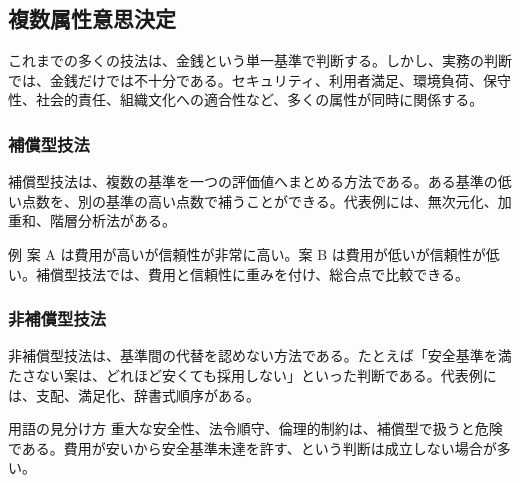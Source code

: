 \subsection{複数属性意思決定}

これまでの多くの技法は、金銭という単一基準で判断する。しかし、実務の判断では、金銭だけでは不十分である。セキュリティ、利用者満足、環境負荷、保守性、社会的責任、組織文化への適合性など、多くの属性が同時に関係する。

\subsubsection{補償型技法}

補償型技法は、複数の基準を一つの評価値へまとめる方法である。ある基準の低い点数を、別の基準の高い点数で補うことができる。代表例には、無次元化、加重和、階層分析法がある。

\begin{notebox}{例}
案 A は費用が高いが信頼性が非常に高い。案 B は費用が低いが信頼性が低い。補償型技法では、費用と信頼性に重みを付け、総合点で比較できる。
\end{notebox}

\subsubsection{非補償型技法}

非補償型技法は、基準間の代替を認めない方法である。たとえば「安全基準を満たさない案は、どれほど安くても採用しない」といった判断である。代表例には、支配、満足化、辞書式順序がある。

\begin{notebox}{用語の見分け方}
重大な安全性、法令順守、倫理的制約は、補償型で扱うと危険である。費用が安いから安全基準未達を許す、という判断は成立しない場合が多い。
\end{notebox}
